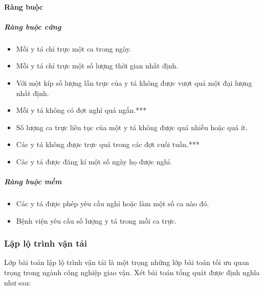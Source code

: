 \documentclass[a4paper,12pt]{report}
\begin{document}
\paragraph{Ràng buộc}
\subparagraph{Ràng buộc cứng}
\begin{itemize}
\item Mỗi y tá chỉ trực một ca trong ngày.
\item Mỗi y tá chỉ trực một số lượng thời gian nhất định.
\item Với một kíp số lượng lần trực của y tá không được vượt quá một đại lượng nhất định.
\item Mỗi y tá không có đợt nghỉ quá ngắn.***
\item Số lượng ca trực liên tục của một y tá không được quá nhiều hoặc quá ít.
\item Các y tá không được trực quá trong các đợt cuối tuần.***
\item Các y tá được đăng kí một số ngày họ được nghỉ.
\end{itemize}
\subparagraph{Ràng buộc mềm}
\begin{itemize}
\item Các y tá được phép yêu cầu nghỉ hoặc làm một số ca nào đó.
\item Bệnh viện yêu cầu số lượng y tá trong mỗi ca trực.
\end{itemize}

\subsubsection{Lập lộ trình vận tải}
Lớp bài toán lập lộ trình vận tải là một trọng những lớp bài toán tối ưu quan trọng trong ngành công nghiệp giao vận. Xét bài toán tổng quát được định nghĩa như sau:
\end{document}
